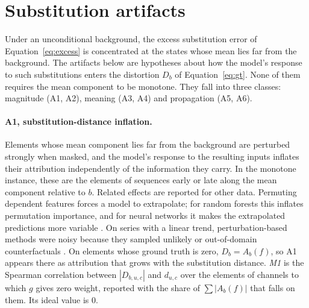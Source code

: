 \documentclass{article}
\begin{document}
\section{Substitution artifacts}
\label{sec:artifacts}

Under an unconditional background, the excess substitution error of Equation~\eqref{eq:excess} is concentrated at the states whose mean lies far from the background. The artifacts below are hypotheses about how the model's response to such substitutions enters the distortion $D_b$ of Equation~\eqref{eq:gt}. None of them requires the mean component to be monotone. They fall into three classes: magnitude (A1, A2), meaning (A3, A4) and propagation (A5, A6).

\paragraph{A1, substitution-distance inflation.} Elements whose mean component lies far from the background are perturbed strongly when masked, and the model's response to the resulting inputs inflates their attribution independently of the information they carry. In the monotone instance, these are the elements of sequences early or late along the mean component relative to $b$. Related effects are reported for other data. Permuting dependent features forces a model to extrapolate; for random forests this inflates permutation importance, and for neural networks it makes the extrapolated predictions more variable \citep{hooker2021unrestricted}. On series with a linear trend, perturbation-based methods were noisy because they sampled unlikely or out-of-domain counterfactuals \citep{tonekaboni2020went}. On elements whose ground truth is zero, $D_b = A_b(f)$, so A1 appears there as attribution that grows with the substitution distance. \emph{M1} is the Spearman correlation between $|D_{b,u,c}|$ and $d_{u,c}$ over the elements of channels to which $g$ gives zero weight, reported with the share of $\sum|A_b(f)|$ that falls on them. Its ideal value is 0.
\end{document}
